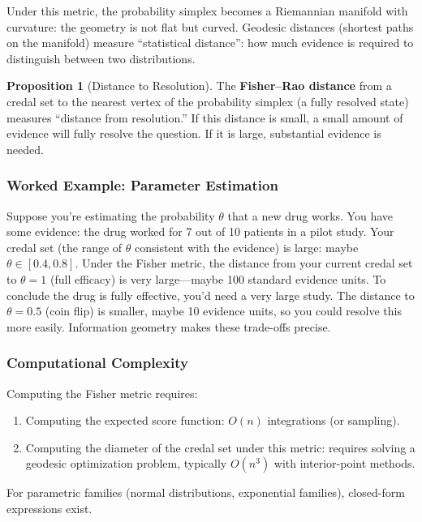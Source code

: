 \documentclass[11pt,letterpaper]{article}
\theoremstyle{definition}
\newtheorem{proposition}{Proposition}[section]
\theoremstyle{remark}
\begin{document}
Under this metric, the probability simplex becomes a Riemannian manifold with curvature: the geometry is not flat but curved. Geodesic distances (shortest paths on the manifold) measure ``statistical distance'': how much evidence is required to distinguish between two distributions.

\begin{proposition}[Distance to Resolution]
The \textbf{Fisher--Rao distance} from a credal set to the nearest vertex of the probability simplex (a fully resolved state) measures ``distance from resolution.'' If this distance is small, a small amount of evidence will fully resolve the question. If it is large, substantial evidence is needed.
\end{proposition}

\subsubsection*{Worked Example: Parameter Estimation}

Suppose you're estimating the probability $\theta$ that a new drug works. You have some evidence: the drug worked for 7 out of 10 patients in a pilot study. Your credal set (the range of $\theta$ consistent with the evidence) is large: maybe $\theta \in [0.4, 0.8]$. Under the Fisher metric, the distance from your current credal set to $\theta = 1$ (full efficacy) is very large---maybe 100 standard evidence units. To conclude the drug is fully effective, you'd need a very large study. The distance to $\theta = 0.5$ (coin flip) is smaller, maybe 10 evidence units, so you could resolve this more easily. Information geometry makes these trade-offs precise.

\subsubsection*{Computational Complexity}

Computing the Fisher metric requires:
\begin{enumerate}
\item Computing the expected score function: $O(n)$ integrations (or sampling).
\item Computing the diameter of the credal set under this metric: requires solving a geodesic optimization problem, typically $O(n^3)$ with interior-point methods.
\end{enumerate}

For parametric families (normal distributions, exponential families), closed-form expressions exist.
\end{document}
